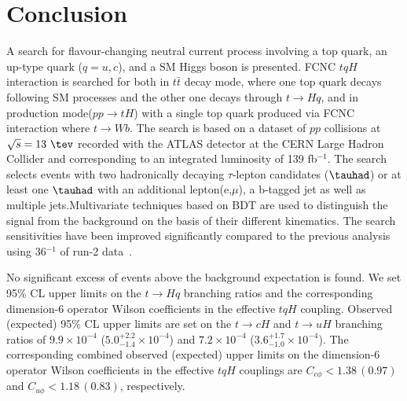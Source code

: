 \section{Conclusion}
\label{sec:conclusion}
A search for flavour-changing neutral current process involving a top quark, an up-type quark ($q=u, c$), and a SM Higgs boson is presented. FCNC $tqH$ interaction is searched for both in $t\bar{t}$ decay mode, where one top quark decays following SM processes and the other one decays through $t\rightarrow Hq$, and in production mode($pp\rightarrow tH$) with a single top quark produced via FCNC interaction where $t\to Wb$. The search is based on a dataset of $pp$ collisions at $\sqrt{s}=13~\tev$ recorded with the ATLAS detector at the CERN Large Hadron Collider and corresponding to an integrated luminosity of 139 fb$^{-1}$. The search selects events with two hadronically decaying $\tau$-lepton candidates ($\tauhad$) or at least one $\tauhad$ with an additional lepton(e,$\mu$), a b-tagged jet as well as multiple jets.Multivariate techniques based on BDT are used to distinguish the signal from the background on the basis of their different kinematics. The search sensitivities have been improved significantly compared to the previous analysis using 36$^{-1}$ of run-2 data~\cite{Aaboud2019SearchFT}. 

No significant excess of events above the background expectation is found. We set 95\% CL upper limits on the $t\to Hq$ branching ratios and the corresponding
dimension-6 operator Wilson coefficients in the effective $tqH$ coupling. 
Observed (expected) 95\% CL upper limits are set on the $t\to cH$ and $t\to uH$ branching ratios of $9.9\times10^{-4}$ ($5.0^{+2.2}_{-1.4}\times10^{-4}$) and $7.2\times10^{-4}$ ($3.6^{+1.7}_{-1.0}\times10^{-4}$).
The corresponding combined observed (expected) upper limits on the dimension-6 operator Wilson coefficients in
the effective $tqH$ couplings are $C_{c\phi} <1.38\, (0.97)$ and $C_{u\phi} <1.18\, (0.83)$, respectively.
